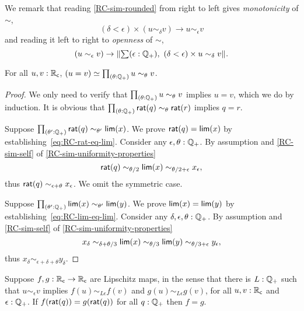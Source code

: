 \noindent
We remark that reading \autoref{RC-sim-rounded} from right to left gives
\emph{monotonicity} of $\sim$,
%
\begin{equation*}
  (\delta < \epsilon) \times (u \sim_\delta v) \to u \sim_\epsilon v
\end{equation*}
%
and reading it left to right to \emph{openness} of $\sim$,
%
\begin{equation*}
  (u \sim_\epsilon v) \to \brck{\sm{\epsilon : \Qp} (\delta < \epsilon) \times u \sim_\delta v}.
\end{equation*}

\begin{lem} \label{RC-weak-archimedean}
  For all $u, v : \mathbb{R}_\mathsf{c}$, $\eqv{(u = v)}{\prd{\theta : \Qp} u \sim_\theta v}$.
\end{lem}

\begin{proof}
  We only need to verify that $\prd{\theta : \Qp} u \sim_\theta v$ implies $u = v$,
  which we do by induction. It is obvious that $\prd{\theta : \Qp} \rcrat(q)
  \sim_\theta \rcrat(r)$ implies $q = r$.

  Suppose $\prd{\theta' : \Qp} \rcrat(q) \sim_{\theta'} \rclim(x)$. We prove $\mathsf{rat}(q) =
  \mathsf{lim}(x)$ by establishing~\eqref{eq:RC-rat-eq-lim}. Consider any $\epsilon, \theta :
  \mathbb{Q}_{+}$. By assumption and \autoref{RC-sim-self} of \autoref{RC-sim-uniformity-properties}
  \begin{equation*}
    \mathsf{rat}(q) \sim_{\theta/2} \mathsf{lim}(x) \sim_{\theta/2 + \epsilon} x_\epsilon,
  \end{equation*}
  thus $\mathsf{rat}(q) \sim_{\epsilon + \theta} x_\epsilon$. We omit the symmetric case.

  Suppose $\prd{\theta' : \Qp} \rclim(x) \sim_{\theta'} \rclim(y)$. We prove $\mathsf{lim}(x) =
  \mathsf{lim}(y)$ by establishing~\eqref{eq:RC-lim-eq-lim}. Consider any $\delta, \epsilon,
  \theta : \mathbb{Q}_{+}$. By assumption and \autoref{RC-sim-self} of
  \autoref{RC-sim-uniformity-properties}
  \begin{equation*}
    x_\delta \sim_{\delta + \theta/3}
    \mathsf{lim}(x) \sim_{\theta/3}
    \mathsf{lim}(y) \sim_{\theta/3 + \epsilon}
    y_\epsilon,
  \end{equation*}
  thus $x_\delta \sim_{\epsilon + \delta + \theta} y_\delta$.
\end{proof}

\begin{lem} \label{RC-Lipschitz-eq}
  Suppose $f,g : \mathbb{R}_\mathsf{c} \to \mathbb{R}_\mathsf{c}$ are Lipschitz maps, in the sense that there is $L : \mathbb{Q}_{+}$
  such that $u \sim_\epsilon v$ implies $f(u) \sim_{L \epsilon} f(v)$ and $g(u) \sim_{L
    \epsilon} g(v)$, for all $u, v : \mathbb{R}_\mathsf{c}$ and $\epsilon : \mathbb{Q}_{+}$. If $f(\mathsf{rat}(q)) =
  g(\mathsf{rat}(q))$ for all $q : \mathbb{Q}_{+}$ then $f = g$.
\end{lem}

